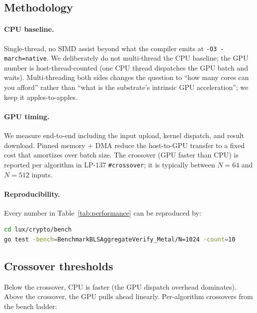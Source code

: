 \subsection{Methodology}

\paragraph{CPU baseline.} Single-thread, no SIMD assist beyond what the compiler emits at \texttt{-O3 -march=native}. We deliberately do not multi-thread the CPU baseline; the GPU number is host-thread-counted (one CPU thread dispatches the GPU batch and waits). Multi-threading both sides changes the question to ``how many cores can you afford'' rather than ``what is the substrate's intrinsic GPU acceleration''; we keep it apples-to-apples.

\paragraph{GPU timing.} We measure end-to-end including the input upload, kernel dispatch, and result download. Pinned memory + DMA reduce the host-to-GPU transfer to a fixed cost that amortizes over batch size. The crossover (GPU faster than CPU) is reported per algorithm in LP-137 \texttt{\#crossover}; it is typically between $N=64$ and $N=512$ inputs.

\paragraph{Reproducibility.} Every number in Table~\ref{tab:performance} can be reproduced by:

\begin{lstlisting}[language=bash]
cd lux/crypto/bench
go test -bench=BenchmarkBLSAggregateVerify_Metal/N=1024 -count=10
\end{lstlisting}

\subsection{Crossover thresholds}

Below the crossover, CPU is faster (the GPU dispatch overhead dominates). Above the crossover, the GPU pulls ahead linearly. Per-algorithm crossovers from the bench ladder:

